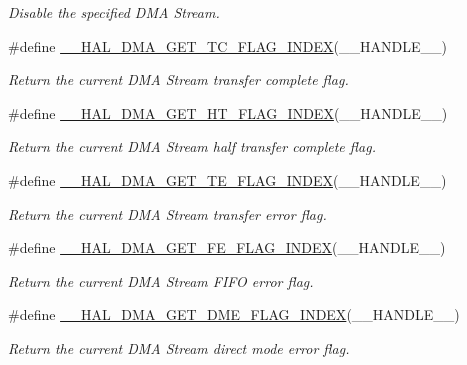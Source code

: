 \begin{DoxyCompactItemize}
\begin{DoxyCompactList}\small\item\em Disable the specified D\+MA Stream. \end{DoxyCompactList}\item 
\#define \hyperlink{group___d_m_a_gae3feef5ea50ff13a6a5b98cb353c87b0}{\+\_\+\+\_\+\+H\+A\+L\+\_\+\+D\+M\+A\+\_\+\+G\+E\+T\+\_\+\+T\+C\+\_\+\+F\+L\+A\+G\+\_\+\+I\+N\+D\+EX}(\+\_\+\+\_\+\+H\+A\+N\+D\+L\+E\+\_\+\+\_\+)
\begin{DoxyCompactList}\small\item\em Return the current D\+MA Stream transfer complete flag. \end{DoxyCompactList}\item 
\#define \hyperlink{group___d_m_a_ga0095f5f3166a82bedc67744ac94acfba}{\+\_\+\+\_\+\+H\+A\+L\+\_\+\+D\+M\+A\+\_\+\+G\+E\+T\+\_\+\+H\+T\+\_\+\+F\+L\+A\+G\+\_\+\+I\+N\+D\+EX}(\+\_\+\+\_\+\+H\+A\+N\+D\+L\+E\+\_\+\+\_\+)
\begin{DoxyCompactList}\small\item\em Return the current D\+MA Stream half transfer complete flag. \end{DoxyCompactList}\item 
\#define \hyperlink{group___d_m_a_ga5e765bb3b1c5fc9f1b1abbbb764250bc}{\+\_\+\+\_\+\+H\+A\+L\+\_\+\+D\+M\+A\+\_\+\+G\+E\+T\+\_\+\+T\+E\+\_\+\+F\+L\+A\+G\+\_\+\+I\+N\+D\+EX}(\+\_\+\+\_\+\+H\+A\+N\+D\+L\+E\+\_\+\+\_\+)
\begin{DoxyCompactList}\small\item\em Return the current D\+MA Stream transfer error flag. \end{DoxyCompactList}\item 
\#define \hyperlink{group___d_m_a_ga5878c3a1dbcf01e6840fffcf1f244088}{\+\_\+\+\_\+\+H\+A\+L\+\_\+\+D\+M\+A\+\_\+\+G\+E\+T\+\_\+\+F\+E\+\_\+\+F\+L\+A\+G\+\_\+\+I\+N\+D\+EX}(\+\_\+\+\_\+\+H\+A\+N\+D\+L\+E\+\_\+\+\_\+)
\begin{DoxyCompactList}\small\item\em Return the current D\+MA Stream F\+I\+FO error flag. \end{DoxyCompactList}\item 
\#define \hyperlink{group___d_m_a_ga23d1f282af3b9aa7aa396dcad94865d8}{\+\_\+\+\_\+\+H\+A\+L\+\_\+\+D\+M\+A\+\_\+\+G\+E\+T\+\_\+\+D\+M\+E\+\_\+\+F\+L\+A\+G\+\_\+\+I\+N\+D\+EX}(\+\_\+\+\_\+\+H\+A\+N\+D\+L\+E\+\_\+\+\_\+)
\begin{DoxyCompactList}\small\item\em Return the current D\+MA Stream direct mode error flag. \end{DoxyCompactList}\item 

\end{DoxyCompactItemize}

